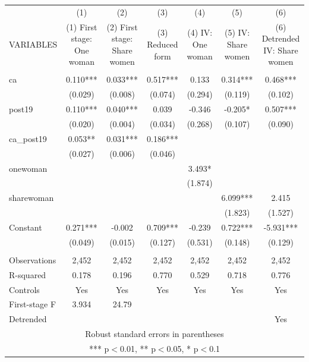 \begin{tabular}{lcccccc} \hline
 & (1) & (2) & (3) & (4) & (5) & (6) \\
VARIABLES & (1) First stage: One woman & (2) First stage: Share women & (3) Reduced form & (4) IV: One woman & (5) IV: Share women & (6) Detrended IV: Share women \\ \hline
 &  &  &  &  &  &  \\
ca & 0.110*** & 0.033*** & 0.517*** & 0.133 & 0.314*** & 0.468*** \\
 & (0.029) & (0.008) & (0.074) & (0.294) & (0.119) & (0.102) \\
post19 & 0.110*** & 0.040*** & 0.039 & -0.346 & -0.205* & 0.507*** \\
 & (0.020) & (0.004) & (0.034) & (0.268) & (0.107) & (0.090) \\
ca\_post19 & 0.053** & 0.031*** & 0.186*** &  &  &  \\
 & (0.027) & (0.006) & (0.046) &  &  &  \\
onewoman &  &  &  & 3.493* &  &  \\
 &  &  &  & (1.874) &  &  \\
sharewoman &  &  &  &  & 6.099*** & 2.415 \\
 &  &  &  &  & (1.823) & (1.527) \\
Constant & 0.271*** & -0.002 & 0.709*** & -0.239 & 0.722*** & -5.931*** \\
 & (0.049) & (0.015) & (0.127) & (0.531) & (0.148) & (0.129) \\
 &  &  &  &  &  &  \\
Observations & 2,452 & 2,452 & 2,452 & 2,452 & 2,452 & 2,452 \\
R-squared & 0.178 & 0.196 & 0.770 & 0.529 & 0.718 & 0.776 \\
Controls & Yes & Yes & Yes & Yes & Yes & Yes \\
First-stage F & 3.934 & 24.79 &  &  &  &  \\
 Detrended &  &  &  &  &  & Yes \\ \hline
\multicolumn{7}{c}{ Robust standard errors in parentheses} \\
\multicolumn{7}{c}{ *** p$<$0.01, ** p$<$0.05, * p$<$0.1} \\
\end{tabular}
